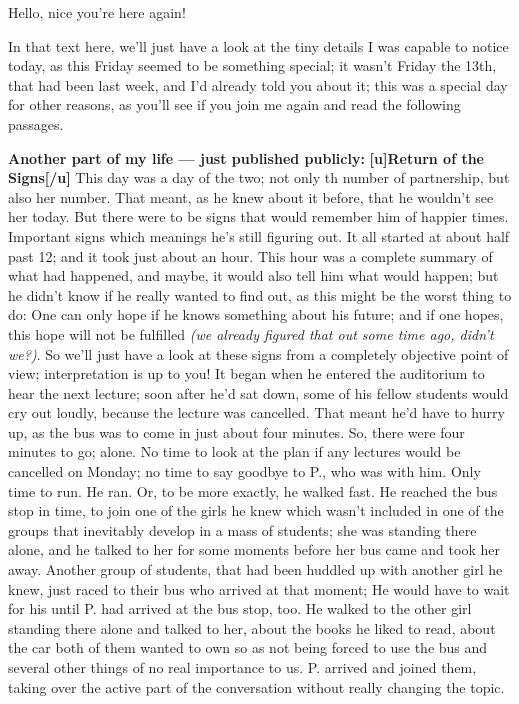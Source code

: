 Hello, nice you're here again!

In that text here, we'll just have a look at the tiny details I was capable to notice today, as this Friday seemed to be something special; it wasn't Friday the 13th, that had been last week, and I'd already told you about it; this was a special day for other reasons, as you'll see if you join me again and read the following passages. 

\textbf{Another part of my life --- just published publicly:}
\textbf{[u]Return of the Signs[/u]}
This day was a day of the two; not only th number of partnership, but also her number. That meant, as he knew about it before, that he wouldn't see her today. 
But there were to be signs that would remember him of happier times. 
Important signs which meanings he's still figuring out. 
It all started at about half past 12; and it took just about an hour. 
This hour was a complete summary of what had happened, and maybe, it would also tell him what would happen; but he didn't know if he really wanted to find out, as this might be the worst thing to do:
One can only hope if he knows something about his future; and if one hopes, this hope will not be fulfilled \emph{(we already figured that out some time ago, didn't we?)}. 
So we'll just have a look at these signs from a completely objective point of view; interpretation is up to you!
It began when he entered the auditorium to hear the next lecture; soon after he'd sat down, some of his fellow students would cry out loudly, because the lecture was cancelled. That meant he'd have to hurry up, as the bus was to come in just about four minutes. So, there were four minutes to go; alone. 
No time to look at the plan if any lectures would be cancelled on Monday; no time to say goodbye to P., who was with him. 
Only time to run. 
He ran. 
Or, to be more exactly, he walked fast. 
He reached the bus stop in time, to join one of the girls he knew which wasn't included in one of the groups that inevitably develop in a mass of students; she was standing there alone, and he talked to her for some moments before her bus came and took her away. Another group of students, that had been huddled up with another girl he knew, just raced to their bus who arrived at that moment; He would have to wait for his until P. had arrived at the bus stop, too. 
He walked to the other girl standing there alone and talked to her, about the books he liked to read, about the car both of them wanted to own so as not being forced to use the bus and several other things of no real importance to us. 
P. arrived and joined them, taking over the active part of the conversation without really changing the topic. 
